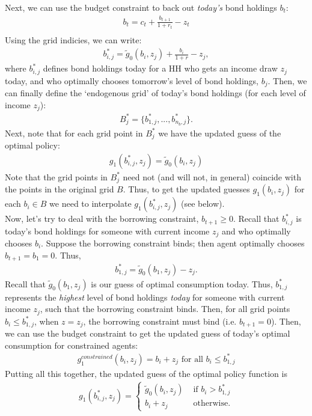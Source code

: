 \documentclass[12pt]{article}
\begin{document}
Next, we can use the budget constraint to back out \textit{today's} bond holdings $b_t$:
\begin{align*}
b_t = c_t + \frac{b_{t+1}}{1+r_t} - z_t\\
\end{align*}
Using the grid indicies, we can write:
\begin{align*}
b^*_{i,j} = \tilde g_0(b_i,z_j) + \frac{b_i}{1+r} - z_j,
\end{align*}
where $b^*_{i,j}$ defines bond holdings today for a HH who gets an income draw $z_j$ today, and who optimally chooses tomorrow's level of bond holdings, $b_j$. Then, we can finally define the `endogenous grid' of today's bond holdings (for each level of income $z_j$):
\begin{align*}
B_j^* = \{ b^*_{1,j}, ... , b^*_{n_b,j}\}.
\end{align*}
Next, note that for each grid point in $B_j^*$ we have the updated guess of the optimal policy:
\begin{align*}
g_1(b^*_{i,j},z_j) =  \tilde g_0(b_i,z_j)
\end{align*}
Note that the grid points in $B_j^*$ need not (and will not, in general) coincide with the points in the original grid $B$. Thus, to get the updated guesses $g_1(b_i,z_j)$ for each $b_i \in B$ we need to interpolate $g_1(b^*_{i,j},z_j)$ (see below).\\

Now, let's try to deal with the borrowing constraint, $b_{t+1} \geq 0$. Recall that $b^*_{i,j}$ is today's bond holdings for someone with current income $z_j$ and who optimally chooses $b_i$. Suppose the borrowing constraint binds;  then agent optimally chooses $b_{t+1} = b_1 =0$. Thus,
\begin{align*}
b^*_{1,j} = \tilde g_0(b_1,z_j) - z_j.
\end{align*}
Recall that $\tilde g_0(b_1,z_j)$ is our guess of optimal consumption today. Thus, $b^*_{1,j}$ represents the \textit{highest} level of bond holdings \textit{today} for someone with current income $z_j$, such that the borrowing constraint binds. Then, for all grid points $b_i \leq b^*_{1,j}$, when $z=z_j$, the borrowing constraint must bind (i.e. $b_{t+1}=0$). Then, we can use the budget constraint to get the updated guess of today's optimal consumption for constrained agents:
\begin{align*}
g_1^{constrained}(b_i,z_j) = b_i + z_j \text{ for all } b_i \leq b^*_{1,j}
\end{align*}
Putting all this together, the updated guess of the optimal policy function is
\begin{align*}
g_1(b^*_{i,j},z_j) = 
\begin{cases}
\tilde g_0(b_i,z_j) &\text{ if } b_i > b^*_{1,j}\\
b_i + z_j &\text{ otherwise.}
\end{cases}
\end{align*}
\end{document}
